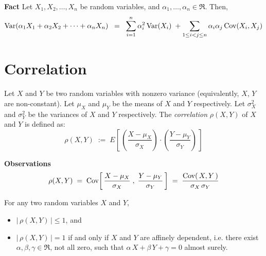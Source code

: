 \documentclass{article}
\begin{document}
\vskip 0.5cm
\noindent
\textbf{Fact} \quad Let $X_{1},X_{2},\ldots,X_{n}$ be random variables, and $\alpha_{1},\ldots,\alpha_{n}\in\Re$.
Then,
\begin{equation*}
\textnormal{Var}\!\left(\alpha_{1}X_{1}+\alpha_{2}X_{2}+\cdots+\alpha_{n}X_{n}\right) \;\; = \;\;
\sum^{n}_{i=1} \alpha_{i}^{2}\,\textnormal{Var}(X_{i}) \; + \sum_{1\leq i < j \leq n}\alpha_{i}\alpha_{j}\,\textnormal{Cov}(X_{i},X_{j})
\end{equation*}


\section{Correlation}
\setcounter{theorem}{0}

Let $X$ and $Y$ be two random variables with nonzero variance (equivalently, $X$, $Y$ are non-constant).
Let $\mu_{X}$ and $\mu_{Y}$ be the means of $X$ and $Y$ respectively.
Let $\sigma_{X}^{2}$ and $\sigma_{Y}^{2}$ be the variances of $X$ and $Y$ respectively.
The \emph{correlation} $\rho(X,Y)$ of $X$ and $Y$ is defined as:
\begin{equation*}
\rho(X,Y)
\; := \; E\!\left[\,\left(\dfrac{X-\mu_{X}}{\sigma_{X}}\right)\cdot\left(\dfrac{Y-\mu_{Y}}{\sigma_{Y}}\right)\,\right]
\end{equation*}

\noindent
\textbf{Observations}
\begin{equation*}
\rho(X,Y)
\; = \; \textnormal{Cov}\!\left[\,\dfrac{X-\mu_{X}}{\sigma_{X}}\;,\;\dfrac{Y-\mu_{Y}}{\sigma_{Y}}\,\right]
\; = \; \dfrac{\textnormal{Cov}(\,X,Y\,)}{\sigma_{X}\,\sigma_{Y}}
\end{equation*}

\vskip 0.5cm
\begin{theorem}\quad For any two random variables $X$ and $Y$,
\begin{itemize}
\item  $\left\vert\,\rho(X,Y)\,\right\vert \leq 1$, and
\item  $\left\vert\,\rho(X,Y)\,\right\vert = 1$ if and only if $X$ and $Y$ are affinely dependent, i.e.
          there exist $\alpha, \beta, \gamma \in \Re$, not all zero, such that $\alpha\,X + \beta\,Y + \gamma=0$ almost surely.
\end{itemize}
\end{theorem}


\appendix



%
%
%



\end{document}
